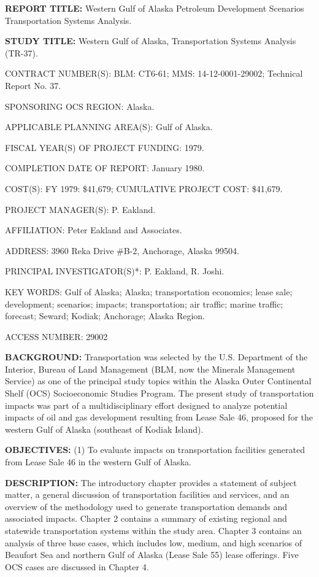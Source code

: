 \documentclass[11pt,a4paper]{article}
\begin{document}
\textbf{REPORT TITLE:}  Western Gulf of Alaska Petroleum Development Scenarios Transportation Systems Analysis.

\textbf{STUDY TITLE:}  Western Gulf of Alaska, Transportation Systems Analysis (TR-37).

CONTRACT NUMBER(S): BLM: CT6-61; MMS: 14-12-0001-29002; Technical Report No. 37.

SPONSORING OCS REGION: Alaska.

APPLICABLE PLANNING AREA(S): Gulf of Alaska.

FISCAL YEAR(S) OF PROJECT FUNDING: 1979.

COMPLETION DATE OF REPORT: January 1980.

COST(S): FY 1979: \$41,679; CUMULATIVE PROJECT COST: \$41,679.

PROJECT MANAGER(S): P. Eakland.

AFFILIATION: Peter Eakland and Associates.

ADDRESS: 3960 Reka Drive \#B-2, Anchorage, Alaska  99504.

PRINCIPAL INVESTIGATOR(S)*: P. Eakland, R. Joshi.

KEY WORDS: Gulf of Alaska; Alaska; transportation economics; lease sale; development; scenarios; impacts; transportation; air traffic; marine traffic; forecast; Seward; Kodiak; Anchorage; Alaska Region.

ACCESS NUMBER: 29002

\textbf{BACKGROUND:} Transportation was selected by the U.S. Department of the Interior, Bureau of Land Management (BLM, now the Minerals Management Service) as one of the principal study topics within the Alaska Outer Continental Shelf (OCS) Socioeconomic Studies Program.  The present study of transportation impacts was part of a multidisciplinary effort designed to analyze potential impacts of oil and gas development resulting from Lease Sale 46, proposed for the western Gulf of Alaska (southeast of Kodiak Island).

\textbf{OBJECTIVES:} (1) To evaluate impacts on transportation facilities generated from Lease Sale 46 in the western Gulf of Alaska.

\textbf{DESCRIPTION:} The introductory chapter provides a statement of subject matter, a general discussion of transportation facilities and services, and an overview of the methodology used to generate transportation demands and associated impacts.  Chapter 2 contains a summary of existing regional and statewide transportation systems within the study area.  Chapter 3 contains an analysis of three base cases, which includes low, medium, and high scenarios of Beaufort Sea and northern Gulf of Alaska (Lease Sale 55) lease offerings.  Five OCS cases are discussed in Chapter 4.
\end{document}
